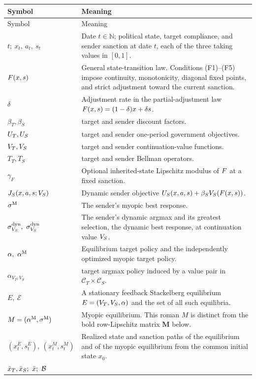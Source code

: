 \begin{longtable}{@{}p{}p{}@{}}
\toprule
Symbol & Meaning\\
\midrule
\endfirsthead
\toprule
Symbol & Meaning\\
\midrule
\endhead
$t;\ x_t,\ a_t,\ s_t$
& Date $t\in\mathbb N$; political state, target compliance, and sender
sanction at date $t$, each of the three taking values in $[0,1]$.\\
$F(x,s)$
& General state-transition law. Conditions \textup{(F1)--(F5)} impose
continuity, monotonicity, diagonal fixed points, and strict adjustment
toward the current sanction.\\
$\delta$
& Adjustment rate in the partial-adjustment law
$F(x,s)=(1-\delta)x+\delta s$.\\
$\beta_T,\beta_S$
& target and sender discount factors.\\
$U_T,U_S$
& target and sender one-period government objectives.\\
$V_T,V_S$
& target and sender continuation-value functions.\\
$T_T,T_S$
& target and sender Bellman operators.\\
$\gamma_F$
& Optional inherited-state Lipschitz modulus of $F$ at a fixed sanction.\\
$J_S(x,a,s;V_S)$
& Dynamic sender objective
$U_S(x,a,s)+\beta_SV_S(F(x,s))$.\\
$\sigma^{\mathrm{M}}$
& The sender's myopic best response.\\
$\sigDyn_{\Vs},\ \sigDynTop_{\Vs}$
& The sender's dynamic argmax and its greatest selection, the dynamic best
response, at continuation value $V_S$.\\
$\alpha,\ \alphaM$
& Equilibrium target policy and the independently optimized myopic target
policy.\\
$\alpha_{V_T,V_S}$
& target argmax policy induced by a value pair in
$\mathcal C_T\times\mathcal C_S$.\\
$E,\ \mathcal E$
& A stationary feedback Stackelberg equilibrium
$E=(V_T,V_S,\alpha)$ and the set of all such equilibria.\\
$M=(\alpha^{\mathrm{M}},\sigma^{\mathrm{M}})$
& Myopic equilibrium. This roman $M$ is distinct from the
bold row-Lipschitz matrix $\mathbf M$ below.\\
$(x_t^E,s_t^E),\ (x_t^M,s_t^M)$
& Realized state and sanction paths of the equilibrium and of the myopic
equilibrium from the common initial state $x_0$.\\
$\bar x_T,\bar x_S;\ \bar x;\ \mathcal{B}$

\end{longtable}
